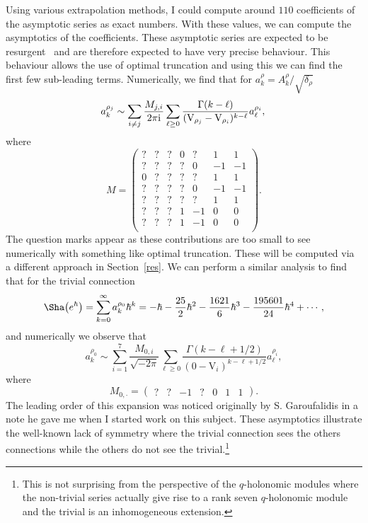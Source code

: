 \documentclass[pdftex]{sigma}
\numberwithin{equation}{section}
\def\ae{\sim}
\def\be{\begin{equation}}
\def\ee{\end{equation}}
\def\VC{\mathrm{VC}}
\def\WRT{\Sha}
\def\be{\begin{equation}}
\def\ee{\end{equation}}
\def\VC{\mathrm{V}}
\begin{document}
Using various extrapolation methods, I could compute around $110$ coefficients of the asymptotic series as exact numbers. With these values, we can compute the asymptotics of the coefficients. These asymptotic series are expected to be resurgent~\cite{Gar:resCS} and are therefore expected to have very precise behaviour. This behaviour allows the use of optimal truncation and using this we can find the first few sub-leading terms. Numerically, we find that for $a_{k}^{\rho}=A_{k}^{\rho}/\sqrt{\delta_{\rho}}$
\[
 a_{k}^{\rho_j}
 \ae
 \sum_{i\neq j}\frac{M_{j,i}}{2\pi {\rm i}}\sum_{\ell\geq0}\frac{\Gamma(k-\ell)}{(\VC_{\rho_j}-\VC_{\rho_i})^{k-\ell}}a_{\ell}^{\rho_i},\\
\]
where
\be\label{eq:closeststokes}
M
 =
\begin{pmatrix}
 ? & ? & ? & 0 & ? & 1 & 1\\
 ? & ? & ? & ? & 0 & -1 & -1\\
 0 & ? & ? & ? & ? & 1 & 1\\
 ? & ? & ? & ? & 0 & -1 & -1\\
 ? & ? & ? & ? & ? & 1 & 1\\
 ? & ? & ? & 1 & -1 & 0 & 0\\
 ? & ? & ? & 1 & -1 & 0 & 0\\
\end{pmatrix} .
\ee
The question marks appear as these contributions are too small to see numerically with something like optimal truncation. These will be computed via a different approach in Section~\ref{res}. We can perform a similar analysis to find that for the trivial connection
\[
 \WRT\bigl(e^{\hbar}\bigr)
  =
 \sum_{k=0}^{\infty}a_{k}^{\rho_0}\hbar^{k}
  =
 -\hbar - \frac{25}{2}\hbar^2 - \frac{1621}{6}\hbar^3 - \frac{195601}{24}\hbar^4+\cdots ,
\]
and numerically we observe that
\[
 a_{k}^{\rho_0}
 \ae
 \sum_{i=1}^{7}\frac{M_{0,i}}{\sqrt{-2\pi}}\sum_{\ell\geq0}\frac{\Gamma(k-\ell+1/2)}{(0-\VC_{i})^{k-\ell+1/2}}a_{\ell}^{\rho_i} ,
\]
where
\[
M_{0,\cdot}
 =
\begin{pmatrix}
 ? & ? & -1 & ? & 0 & 1 & 1
\end{pmatrix} .
\]
The leading order of this expansion was noticed originally by S. Garoufalidis in a note he gave me when I started work on this subject. These asymptotics illustrate the well-known lack of symmetry where the trivial connection sees the others connections while the others do not see the trivial.\footnote{This is not surprising from the perspective of the $q$-holonomic modules where the non-trivial series actually give rise to a rank seven $q$-holonomic module and the trivial is an inhomogeneous extension.}
\end{document}
